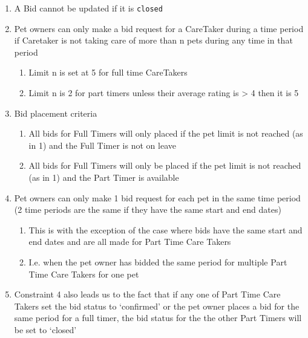 \documentclass[
  paper=a4,
  ,captions=tableheading
]{scrartcl}
\newcommand{\passthrough}[1]{#1}
\providecommand{\tightlist}{%
  \setlength{\itemsep}{0pt}\setlength{\parskip}{0pt}}
\begin{document}
\begin{enumerate}
\def\labelenumi{\arabic{enumi}.}
\tightlist
\item
  A Bid cannot be updated if it is \passthrough{\lstinline!closed!}
\item
  Pet owners can only make a bid request for a CareTaker during a time
  period if Caretaker is not taking care of more than n pets during any
  time in that period

  \begin{enumerate}
  \def\labelenumii{\arabic{enumii}.}
  \tightlist
  \item
    Limit n is set at 5 for full time CareTakers
  \item
    Limit n is 2 for part timers unless their average rating is
    \textgreater{} 4 then it is 5
  \end{enumerate}
\item
  Bid placement criteria

  \begin{enumerate}
  \def\labelenumii{\arabic{enumii}.}
  \tightlist
  \item
    All bids for Full Timers will only placed if the pet limit is not
    reached (as in 1) and the Full Timer is not on leave
  \item
    All bids for Full Timers will only be placed if the pet limit is not
    reached (as in 1) and the Part Timer is available
  \end{enumerate}
\item
  Pet owners can only make 1 bid request for each pet in the same time
  period (2 time periods are the same if they have the same start and
  end dates)

  \begin{enumerate}
  \def\labelenumii{\arabic{enumii}.}
  \tightlist
  \item
    This is with the exception of the case where bids have the same
    start and end dates and are all made for Part Time Care Takers
  \item
    I.e. when the pet owner has bidded the same period for multiple Part
    Time Care Takers for one pet
  \end{enumerate}
\item
  Constraint 4 also leads us to the fact that if any one of Part Time
  Care Takers set the bid status to `confirmed' or the pet owner places
  a bid for the same period for a full timer, the bid status for the the
  other Part Timers will be set to `closed'
\end{enumerate}
\end{document}
